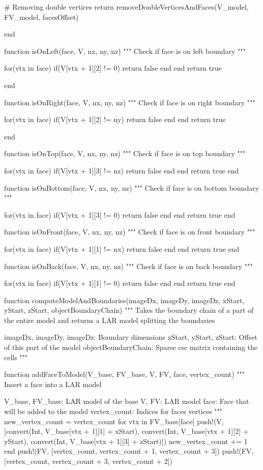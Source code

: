 \documentclass[11pt,oneside]{article}	%
\begin{document}
{  # Removing double vertices
  return removeDoubleVerticesAndFaces(V_model, FV_model, facesOffset)

end

function isOnLeft(face, V, nx, ny, nz)
  """
  Check if face is on left boundary
  """

  for(vtx in face)
    if(V[vtx + 1][2] != 0)
      return false
    end
  end
  return true

end

function isOnRight(face, V, nx, ny, nz)
  """
  Check if face is on right boundary
  """

  for(vtx in face)
    if(V[vtx + 1][2] != ny)
      return false
    end
  end
  return true

end

function isOnTop(face, V, nx, ny, nz)
  """
  Check if face is on top boundary
  """

  for(vtx in face)
    if(V[vtx + 1][3] != nz)
      return false
    end
  end
  return true
end

function isOnBottom(face, V, nx, ny, nz)
  """
  Check if face is on bottom boundary
  """

  for(vtx in face)
    if(V[vtx + 1][3] != 0)
      return false
    end
  end
  return true
end

function isOnFront(face, V, nx, ny, nz)
  """
  Check if face is on front boundary
  """

  for(vtx in face)
    if(V[vtx + 1][1] != nx)
      return false
    end
  end
  return true
end

function isOnBack(face, V, nx, ny, nz)
  """
  Check if face is on back boundary
  """

  for(vtx in face)
    if(V[vtx + 1][1] != 0)
      return false
    end
  end
  return true
end

function computeModelAndBoundaries(imageDx, imageDy, imageDz,
                      xStart, yStart, zStart,
                      objectBoundaryChain)
  """
  Takes the boundary chain of a part of the entire model
  and returns a LAR model splitting the boundaries

  imageDx, imageDy, imageDz: Boundary dimensions
  xStart, yStart, zStart: Offset of this part of the model
  objectBoundaryChain: Sparse csc matrix containing the cells
  """

  function addFaceToModel(V_base, FV_base, V, FV, face, vertex_count)
    """
    Insert a face into a LAR model

    V_base, FV_base: LAR model of the base
    V, FV: LAR model
    face: Face that will be added to the model
    vertex_count: Indices for faces vertices
    """
    new_vertex_count = vertex_count
    for vtx in FV_base[face]
      push!(V, [convert(Int, V_base[vtx + 1][1] + xStart),
                      convert(Int, V_base[vtx + 1][2] + yStart),
                      convert(Int, V_base[vtx + 1][3] + zStart)])
      new_vertex_count += 1
    end
    push!(FV, [vertex_count, vertex_count + 1, vertex_count + 3])
    push!(FV, [vertex_count, vertex_count + 3, vertex_count + 2])

}
\end{document}
